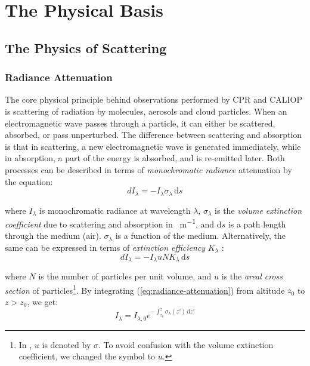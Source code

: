 \chapter{The Physical Basis}\label{chap:physical-basis}

\section{The Physics of Scattering}
\subsection{Radiance Attenuation}
The core physical principle behind observations performed by CPR and CALIOP is
scattering of radiation by molecules, aerosols and cloud particles. When an
electromagnetic wave passes through a particle, it can either be scattered,
absorbed, or pass unperturbed. The difference between scattering and absorption
is that in scattering, a new electromagnetic wave is generated immediately, while in
absorption, a part of the energy is absorbed, and is re-emitted later. Both
processes can be described in terms of \textit{monochromatic radiance} attenuation by the
equation:
\begin{equation}\label{eq:radiance-attenuation}
dI_\lambda = -I_\lambda \sigma_\lambda \, \mathrm{d}s
\end{equation}

\noindent where $I_\lambda$ is monochromatic radiance at wavelength $\lambda$,
$\sigma_\lambda$ is the \textit{volume extinction
coefficient} due to scattering and absorption in \SI{}{m^{-1}}, and $\mathrm{d}s$
is a
path length through the medium (air).
$\sigma_\lambda$ is a function of the medium.
Alternatively, the same can be expressed in terms of \textit{extinction
efficiency} $K_\lambda$ \citep{WallaceHobbs2006}:
\begin{equation}
dI_\lambda = -I_\lambda u N K_\lambda \, \mathrm{d}s
\end{equation}

\noindent where $N$ is the number of particles per unit volume, and $u$ is the
\textit{areal cross section} of particles\footnote{In
\cite{WallaceHobbs2006}, $u$ is denoted by $\sigma$. To avoid confusion with the
volume extinction coefficient, we changed the symbol to $u$.}.
By integrating (\ref{eq:radiance-attenuation}) from altitude $z_0$
to
$z > z_0$, we get:
\begin{equation}\label{eq:integrated-radiance-attenuation}
I_\lambda = I_{\lambda,0} e^{-\int_{z_0}^z \sigma_\lambda(z') \, \mathrm{d}z'}
\end{equation}

